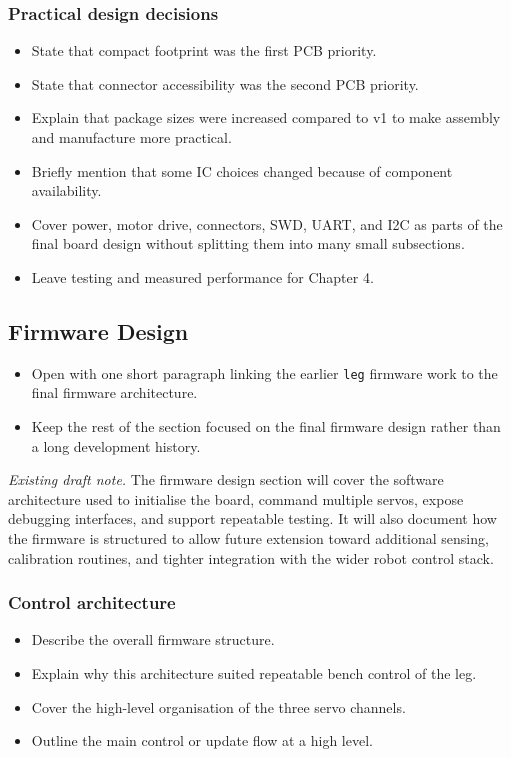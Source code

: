 \subsubsection{Practical design decisions}
\begin{itemize}[label=\textcolor{red}{\textbullet}, before=\color{red}]
  \item State that compact footprint was the first PCB priority.
  \item State that connector accessibility was the second PCB priority.
  \item Explain that package sizes were increased compared to v1 to make assembly and manufacture more practical.
  \item Briefly mention that some IC choices changed because of component availability.
  \item Cover power, motor drive, connectors, SWD, UART, and I2C as parts of the final board design without splitting them into many small subsections.
  \item Leave testing and measured performance for Chapter 4.
\end{itemize}

\subsection{Firmware Design}
\begin{itemize}[label=\textcolor{red}{\textbullet}, before=\color{red}]
  \item Open with one short paragraph linking the earlier \texttt{leg} firmware work to the final firmware architecture.
  \item Keep the rest of the section focused on the final firmware design rather than a long development history.
\end{itemize}

\noindent\textit{Existing draft note.} The firmware design section will cover the software architecture used to initialise the board, command multiple servos, expose debugging interfaces, and support repeatable testing. It will also document how the firmware is structured to allow future extension toward additional sensing, calibration routines, and tighter integration with the wider robot control stack.

\subsubsection{Control architecture}
\begin{itemize}[label=\textcolor{red}{\textbullet}, before=\color{red}]
  \item Describe the overall firmware structure.
  \item Explain why this architecture suited repeatable bench control of the leg.
  \item Cover the high-level organisation of the three servo channels.
  \item Outline the main control or update flow at a high level.
\end{itemize}

